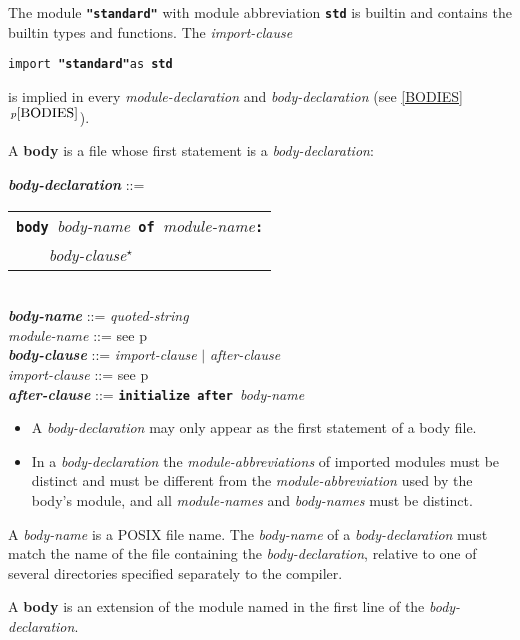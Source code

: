 \documentclass[12pt]{article}
\newcommand{\TT}[1]{{\tt \bfseries #1}}
\newcommand{\STAR}{{\Large $^\star$}}
\newcommand{\key}[1]{{\rm \bfseries #1}}
\newcommand{\ttkey}[1]{{\tt \bfseries #1}}
\newcommand{\emkey}[1]{{\em \bfseries #1}}
\newcommand{\itemref}[1]{\ref{#1}$\,^{p\pageref{#1}}$}
\newcommand{\pagref}[1]{p\pageref{#1}}
\newenvironment{indpar}[1][0.3in]%
	{\begin{list}{}%
		     {\setlength{\itemsep}{0in}%
		      \setlength{\topsep}{0in}%
		      \setlength{\parsep}{1ex}%
		      \setlength{\labelwidth}{#1}%
		      \setlength{\leftmargin}{#1}%
		      \addtolength{\leftmargin}{\labelsep}}%
	 \item}%
	{\end{list}}
\begin{document}
The module \TT{"standard"}\index{standard@\TT{"standard"}} with
module abbreviation \ttkey{std} is builtin and contains the builtin types and
functions.  The {\em import-clause}
\begin{center}
{\tt import }\TT{"standard"}{\tt as \ttkey{std}}
\end{center}
is implied in every {\em module-declaration} and
{\em body-declaration} (see \itemref{BODIES}).

A \key{body} is a file whose first statement is a {\em body-declaration}:

\begin{indpar}
\emkey{body-declaration}\label{BODY-DECLARATION} ::=
    \begin{tabular}[t]{l}
    \TT{body }{\em body-name}\TT{ of }{\em module-name}\TT{:} \\
    \TT{~~~~}{\em body-clause}\STAR{} \\
    \end{tabular}
\\[0.5ex]
\emkey{body-name} ::= {\em quoted-string}
\\[0.5ex]
{\em module-name} ::= see \pagref{MODULE-NAME}
\\[0.5ex]
\emkey{body-clause} ::= {\em import-clause} $|$ {\em after-clause}
\\[0.5ex]
{\em import-clause} ::= see \pagref{IMPORT-CLAUSE}
\\[0.5ex]
\emkey{after-clause} ::= \ttkey{initialize after }{\em body-name}

\begin{itemize}

\item
A {\em body-declaration} may only appear as the first statement
of a body file.

\item
In a {\em body-declaration} the {\em module-abbreviations} of imported
modules must be distinct and must be different from the
{\em module-abbreviation} used by the body's module,
and all {\em module-names} and {\em body-names} must be distinct.
\end{itemize}

\end{indpar}

A {\em body-name} is a POSIX file name.
The {\em body-name} of a {\em body-declaration} must match the
name of the file containing the
{\em body-declaration}, relative to one of several directories
specified separately to the compiler.

A \key{body} is an extension of the module named in the first
line of the {\em body-declaration}.
\end{document}
